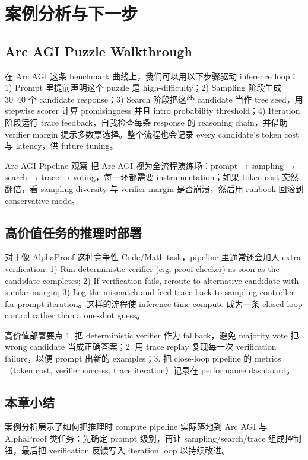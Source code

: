 \section{案例分析与下一步}

\subsection{Arc AGI Puzzle Walkthrough}
在 Arc AGI 这条 benchmark 曲线上，我们可以用以下步骤驱动 inference loop：1) Prompt 里提前声明这个 puzzle 是 high-difficulty；2) Sampling 阶段生成 30~40 个 candidate response；3) Search 阶段把这些 candidate 当作 tree seed，用 stepwise scorer 计算 promisingness 并且 intro probability threshold；4) Iteration 阶段运行 trace feedback，自我检查每条 response 的 reasoning chain，并借助 verifier margin 提示多数票选择。整个流程也会记录 every candidate’s token cost 与 latency，供 future tuning。

\begin{importantbox}{Arc AGI Pipeline 观察}
把 Arc AGI 视为全流程演练场：prompt → sampling → search → trace → voting，每一环都需要 instrumentation；如果 token cost 突然翻倍，看 sampling diversity 与 verifier margin 是否崩溃，然后用 runbook 回滚到 conservative mode。
\end{importantbox}

\subsection{高价值任务的推理时部署}
对于像 AlphaProof 这种竞争性 Code/Math task，pipeline 里通常还会加入 extra verification: 1) Run deterministic verifier (e.g. proof checker) as soon as the candidate completes; 2) If verification fails, reroute to alternative candidate with similar margin; 3) Log the mismatch and feed trace back to sampling controller for prompt iteration。这样的流程使 inference-time compute 成为一条 closed-loop control rather than a one-shot guess。

\begin{knowledgebox}{高价值部署要点}
1. 把 deterministic verifier 作为 fallback，避免 majority vote 把 wrong candidate 当成正确答案；2. 用 trace replay 复现每一次 verification failure，以便 prompt 出新的 examples；3. 把 close-loop pipeline 的 metrics（token cost, verifier success, trace iteration）记录在 performance dashboard。
\end{knowledgebox}

\subsection{本章小结}
案例分析展示了如何把推理时 compute pipeline 实际落地到 Arc AGI 与 AlphaProof 类任务：先确定 prompt 级别，再让 sampling/search/trace 组成控制钮，最后把 verification 反馈写入 iteration loop 以持续改进。

